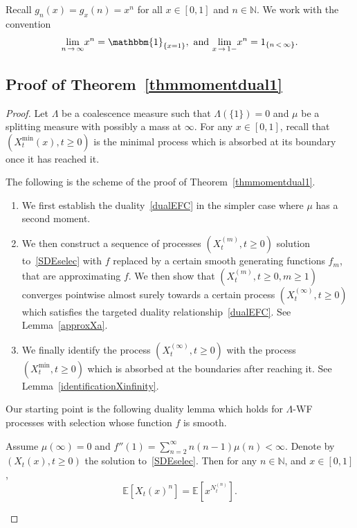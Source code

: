 \documentclass[AHL,Unicode,longabstracts,published]{cedram}
\newcommand{\bbmun}{\mathbbm{1}}
\newcommand{\bbN}{\mathbb{N}}
\newcommand{\bbE}{\mathbb{E}}
\begin{document}
Recall $g_n(x)=g_x(n)=x^n$ for all $x\in [0,1]$ and $n\in \bbN$. We work with the convention
\begin{equation}\label{convention}
\underset{n\,\rightarrow\,\infty}{\lim} x^{n}=\bbmun_{\{x=1\}}, \text{ and } \underset{x\,\rightarrow\,1-}{\lim}x^{n}=1_{\{n\,<\,\infty\}}.
\end{equation}

\subsection{Proof of Theorem~\ref{thmmomentdual1}}\label{momentdual1}

\begin{proof}
Let $\Lambda$ be a coalescence measure such that $\Lambda(\{1\})=0$ and $\mu$ be a splitting measure with possibly a mass at $\infty$. For any $x\in [0,1]$, recall that $(X_t^{\min}(x),t\geq 0)$ is the minimal process which is absorbed at its boundary once it has reached it.



The following is the scheme of the proof of Theorem~\ref{thmmomentdual1}.
\begin{enumerate}
\item\label{sect4.1step1} We first establish the duality~\eqref{dualEFC} in the simpler case where $\mu$ has a second moment.
\item\label{sect4.1step2} We then construct a sequence of processes $(X_t^{(m)},t\geq 0)$ solution to~\eqref{SDEselec} with $f$ replaced by a certain smooth generating functions $f_m$, that are approximating $f$. We then show that $(X_t^{(m)},t\geq 0,m\geq 1)$ converges pointwise almost surely towards a certain process $(X_t^{(\infty)},t\geq 0)$ which satisfies the targeted duality relationship~\eqref{dualEFC}. See Lemma~\ref{approxXa}.
\item\label{sect4.1step3} We finally identify the process $(X_t^{(\infty)},t\geq 0)$ with the process $(X_t^{\min},t\geq 0)$ which is absorbed at the boundaries after reaching it. See Lemma~\ref{identificationXinfinity}.
\end{enumerate}
Our starting point is the following duality lemma which holds for $\Lambda$-WF processes with selection whose function $f$ is smooth.


\begin{lemm}\label{dualfinitemoment}
Assume $\mu(\infty)=0$ and $f''(1)=\sum_{n=2}^{\infty}n(n-1)\mu(n)<\infty$. Denote by $(X_t(x),t\geq 0)$ the solution to~\eqref{SDEselec}. Then for any $n\in \bbN$, and $x\in [0,1]$,
\begin{equation}\label{dualmoment1}
\bbE\left[X_t(x)^n\right]=\bbE\left[x^{N^{(n)}_t}\right].
\end{equation}
\end{lemm}


\end{proof}
\end{document}
